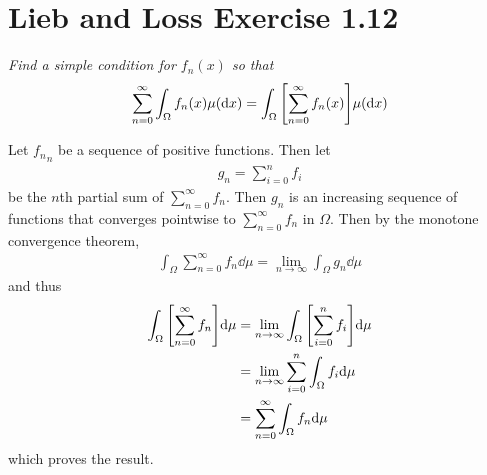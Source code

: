 \documentclass[12pt]{article}
\theoremstyle{plain}
\begin{document}
\section*{Lieb and Loss Exercise 1.12}
\emph{Find a simple condition for $f_n(x)$ so that}
\begin{align*}
    \sum_{n=0}^\infty \int_\Omega f_n(x) \mu(\dd x) = \int_\Omega \qty[\sum_{n=0}^\infty f_n(x)]\mu(\dd x)
\end{align*}

Let ${f_n}_n$ be a sequence of positive functions.  Then let
\begin{align*}
    g_n = \sum_{i = 0}^n f_i
\end{align*}
be the $n$th partial sum of $\sum_{n = 0}^\infty f_n$.  Then $g_n$ is an increasing sequence of functions that converges pointwise to $\sum_{n = 0}^\infty f_n$ in $\Omega$.  Then by the monotone convergence theorem,
\begin{align*}
    \int_\Omega \sum_{n = 0}^\infty f_n \dd \mu= \lim_{n\rightarrow \infty}\int_\Omega g_n \dd \mu
\end{align*}
and thus
\begin{align*}
    \int_\Omega \qty[\sum_{n = 0}^\infty f_n] \dd \mu &= \lim_{n\rightarrow \infty}\int_\Omega \qty[\sum_{i=0}^n f_i] \dd \mu \\
    &= \lim_{n\rightarrow \infty} \sum_{i = 0}^n \int_\Omega f_i \dd \mu \\
    &= \sum_{n = 0}^\infty \int_\Omega f_n \dd \mu
\end{align*}
which proves the result.
\end{document}
